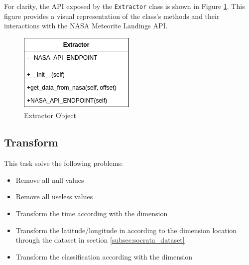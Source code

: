 \documentclass[conference]{IEEEtran}
\begin{document}
	For clarity, the API exposed by the \texttt{Extractor} class is shown in Figure \ref{fig:Extractor}. This figure provides a visual representation of the class's methods and their interactions with the NASA Meteorite Landings API.
	\begin{figure}[htpb]
		\centering
		\includegraphics[width=0.5\columnwidth]{images/Extractor.png}
		\caption{Extractor Object}
		\label{fig:Extractor}
	\end{figure}

    
	
	\subsection{Transform}
	This task solve the following problems:
	\begin{itemize}
		\item Remove all null values
		\item Remove all useless values
		\item Transform the time according with the dimension
		\item Transform the latitude/longitude in according to the dimension location through the dataset in section \ref{subsec:socrata_dataset}
		\item Transform the classification according with the dimension
	\end{itemize}
	
\end{document}
